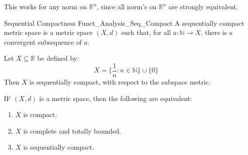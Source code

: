         This works for any norm on $\mathbb{R}^{n}$, since all
        norm's on $\mathbb{R}^{n}$ are strongly equivalent.
        \begin{ldefinition}{Sequential Compactness}
              {Funct_Analysis_Seq_Compact}
            A sequentially compact metric space is a metric
            space $(X,d)$ such that, for all
            $a:\mathbb{N}\rightarrow{X}$, there is a convergent
            subsequence of $a$.
        \end{ldefinition}
        \begin{lexample}
            Let $X\subseteq\mathbb{R}$ be defined by:
            \begin{equation}
                X=\{\frac{1}{n}:n\in\mathbb{N}\}\cup\{0\}
            \end{equation}
            Then $X$ is sequentially compact, with respect
            to the subspace metric.
        \end{lexample}
        \begin{theorem}
            IF $(X,d)$ is a metric space, then the following are
            equivalent:
            \begin{enumerate}
                \item $X$ is compact.
                \item $X$ is complete and totally bounded.
                \item $X$ is sequentially compact.
            \end{enumerate}
        \end{theorem}

